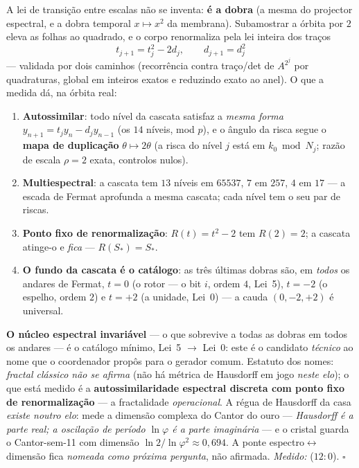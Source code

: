 \documentclass[livro.tex]{subfiles}
\begin{document}
\begin{teorema}\label{thm:renormalizacao}
A lei de transição entre escalas não se inventa: \textbf{é a dobra}
(a mesma do projector espectral, e a dobra temporal $x\mapsto x^{2}$ da membrana).
Subamostrar a órbita por $2$ eleva as folhas ao quadrado, e o corpo
renormaliza pela lei inteira dos traços
\[
\boxed{\;t_{j+1}=t_{j}^{2}-2d_{j},\qquad d_{j+1}=d_{j}^{2}\;}
\]
--- validada por dois caminhos (recorrência contra traço/det de
$A^{2^{j}}$ por quadraturas, global em inteiros exatos e reduzindo
exato ao anel). O que a medida dá, na órbita real:
\begin{enumerate}
\item \textbf{Autossimilar}: todo nível da cascata satisfaz a
\emph{mesma forma} $y_{n+1}=t_{j}y_{n}-d_{j}y_{n-1}$ (os $14$ níveis,
mod $p$), e o ângulo da risca segue o \textbf{mapa de duplicação}
$\theta\mapsto2\theta$ (a risca do nível $j$ está em $k_{0}\bmod
N_{j}$; razão de escala $\rho=2$ exata, controlos nulos).
\item \textbf{Multiespectral}: a cascata tem $13$ níveis em $65537$,
$7$ em $257$, $4$ em $17$ --- a escada de Fermat aprofunda a mesma
cascata; cada nível tem o seu par de riscas.
\item \textbf{Ponto fixo de renormalização}: $R(t)=t^{2}-2$ tem
$R(2)=2$; a cascata atinge-o e \emph{fica} --- $R(S_{*})=S_{*}$.
\item \textbf{O fundo da cascata é o catálogo}: as três últimas dobras
são, em \emph{todos} os andares de Fermat, $t=0$ (o rotor --- o bit
$i$, ordem $4$, Lei~5), $t=-2$ (o espelho, ordem $2$) e $t=+2$ (a
unidade, Lei~0) --- a cauda $(0,-2,+2)$ é universal.
\end{enumerate}
\textbf{O núcleo espectral invariável} --- o que sobrevive a todas as
dobras em todos os andares --- é o catálogo mínimo, Lei~5
$\to$ Lei~0: este é o candidato \emph{técnico} ao nome que o
coordenador propôs para o gerador comum. Estatuto dos nomes:
\emph{fractal clássico não se afirma} (não há métrica de Hausdorff em
jogo \emph{neste elo}); o que está medido é a \textbf{autossimilaridade
espectral discreta com ponto fixo de renormalização} --- a fractalidade
\emph{operacional}. A régua de Hausdorff da casa \emph{existe noutro
elo}:  mede a dimensão complexa do Cantor do ouro
--- \emph{Hausdorff é a parte real; a oscilação de período $\ln\varphi$
é a parte imaginária} --- e o cristal guarda o Cantor-sem-11 com
dimensão $\ln2/\ln\varphi^{2}\approx0{,}694$. A ponte
espectro$\leftrightarrow$dimensão fica \emph{nomeada como próxima
pergunta}, não afirmada.
\emph{Medido:}  ($12{:}0$).
$\square$
\end{teorema}
\end{document}
